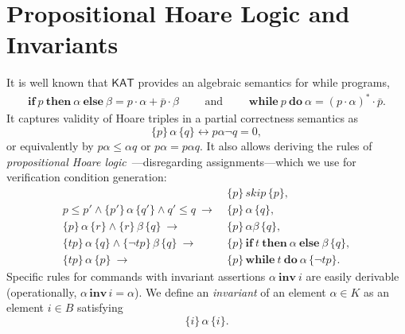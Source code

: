 \documentclass[envcountsame]{llncs}
\newcommand{\IF}[3]{\mathbf{if}\ #1\ \mathbf{then}\ #2\ \mathbf{else}\ #3}
\newcommand{\WHILE}[2]{\mathbf{while}\ #1\ \mathbf{do}\ #2}
\newcommand{\sskip}{\mathit{skip}}
\newcommand{\KAT}{\mathsf{KAT}}
\begin{document}

\section{Propositional Hoare Logic and Invariants}\label{sec:hl-invariants}

It is well known that $\KAT$ provides an algebraic semantics for while
programs,
\begin{align*}
  \IF{p}{\alpha}{\beta} = p\cdot \alpha + \bar p \cdot
  \beta\qquad\text{ and }\qquad
\WHILE{p}{\alpha} = (p\cdot \alpha)^\ast \cdot \bar p.
\end{align*}
It captures validity of Hoare triples in
a partial correctness semantics as
\begin{equation*}
  \{p\}\, \alpha\, \{q\} \leftrightarrow p\alpha\neg q = 0,
\end{equation*}
or equivalently by $p\alpha\le \alpha q$ or $p\alpha = p\alpha q$. It
also allows deriving the rules of \emph{propositional Hoare
  logic}~\cite{Kozen00}---disregarding assignments---which we use for
verification condition generation:
\begin{align}
  &\{p\}\, \sskip\, \{p\}, \label{eq:h-skip}\tag{h-skip}\\
  p\le p' \land \{p'\}\, \alpha\, \{q'\} \land q'\le q\ \rightarrow\ &
                                                                       \{p\}\,
                                                                       \alpha\,
                                                                       \{q\},\label{eq:h-cons}\tag{h-cons}\\
  \{p\}\, \alpha\, \{r\} \land \{r\}\, \beta\, \{q\}\ \rightarrow\
  &\{p\}\, \alpha\beta\, \{q\},\label{eq:h-seq}\tag{h-seq}\\
  \{tp\}\, \alpha\, \{q\}\land \{\neg tp\}\, \beta\, \{q\}\
  \rightarrow\ & \{p\}\, \IF{t}{\alpha}{\beta}\, \{q\},\label{eq:h-cond}\tag{h-cond}\\
  \{tp\}\, \alpha\, \{p\}\ \rightarrow\ & \{p\}\, \WHILE{t}{\alpha}\, \{\neg tp\}.\label{eq:h-while}\tag{h-while}
\end{align}
Specific rules for commands with invariant assertions
$\alpha\ \mathbf{inv}\ i$ are easily derivable (operationally,
$\alpha\, \mathbf{inv}\, i = \alpha$).  We define an \emph{invariant}
of an element $\alpha\in K$ as an element $i\in B$ satisfying
\begin{equation*}
  \{i\}\, \alpha\, \{i\}.
\end{equation*}
\end{document}

